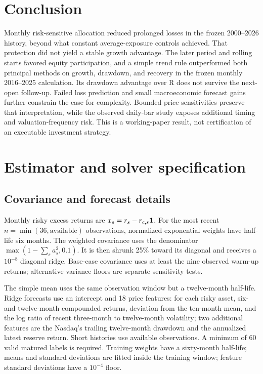 \documentclass[12pt,letterpaper]{article}
\begin{document}
\section{Conclusion}
Monthly risk-sensitive allocation reduced prolonged losses in the frozen 2000--2026 history, beyond what constant average-exposure controls achieved. That protection did not yield a stable growth advantage. The later period and rolling starts favored equity participation, and a simple trend rule outperformed both principal methods on growth, drawdown, and recovery in the frozen monthly 2016--2025 calculation. Its drawdown advantage over R does not survive the next-open follow-up. Failed loss prediction and small macroeconomic forecast gains further constrain the case for complexity. Bounded price sensitivities preserve that interpretation, while the observed daily-bar study exposes additional timing and valuation-frequency risk. This is a working-paper result, not certification of an executable investment strategy.

\clearpage


\clearpage
\appendix
\section{Estimator and solver specification}\label{app:forecast}
\subsection{Covariance and forecast details}
Monthly risky excess returns are $x_s=r_s-r_{c,s}\mathbf 1$. For the most recent $n=\min(36,\text{available})$ observations, normalized exponential weights have half-life six months. The weighted covariance uses the denominator $\max(1-\sum_s a_s^2,0.1)$. It is then shrunk 25\% toward its diagonal and receives a $10^{-8}$ diagonal ridge. Base-case covariance uses at least the nine observed warm-up returns; alternative variance floors are separate sensitivity tests.

The simple mean uses the same observation window but a twelve-month half-life. Ridge forecasts use an intercept and 18 price features: for each risky asset, six- and twelve-month compounded returns, deviation from the ten-month mean, and the log ratio of recent three-month to twelve-month volatility; two additional features are the Nasdaq's trailing twelve-month drawdown and the annualized latest reserve return. Short histories use available observations. A minimum of 60 valid matured labels is required. Training weights have a sixty-month half-life; means and standard deviations are fitted inside the training window; feature standard deviations have a $10^{-4}$ floor.
\end{document}
